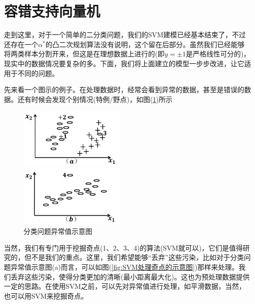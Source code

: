 \section{容错支持向量机}
	\par
	走到这里，对于一个简单的二分类问题，我们的SVM建模已经基本结束了，不过还存在一个$\alpha^*$的凸二次规划算法没有说明，这个留在后部分。虽然我们已经能够将两类样本分割开来，但这是在理想数据上进行的(即$y=\pm1$是严格线性可分的)，现实中的数据情况要复杂的多。下面，我们将上面建立的模型一步步改进，让它适用于不同的问题。
	\par
	先来看一个图示的例子。在处理数据时，经常会看到异常的数据，甚至是错误的数据。还有时候会发现个别情况(特例/野点)，如图(\ref{fig:分类问题异常值示意图})所示
		\begin{figure}[H]
		\centering
		\begin{varwidth}[t]{\textwidth}
		\vspace{0pt}
		\includegraphics[height=3cm]{images/Abnormal_classification_problem1.jpg}
		\end{varwidth}
		\qquad
		\begin{varwidth}[t]{\textwidth}
		\vspace{0pt}
		\includegraphics[height=3cm]{images/Abnormal_classification_problem2.jpg}
		\end{varwidth}
		\caption{分类问题异常值示意图}
		\label{fig:分类问题异常值示意图}
		\end{figure}
	\par
	当然，我们有专门用于挖掘奇点(1、2、3、4)的算法(SVM就可以)，它们是值得研究的，但不是我们的重点。这里，我们希望能够“丢弃”这些污染，比如对于分类问题异常值示意图(a)而言，可以如图(\ref{fig:SVM处理奇点的示意图})那样来处理。我们丢弃这些污染，使得分类更加的清晰(最小距离最大化)。这也为预处理数据提供一定的思路。在使用SVM之前，可以先对异常值进行处理，如平滑数据，当然，也可以用SVM来挖掘奇点。
